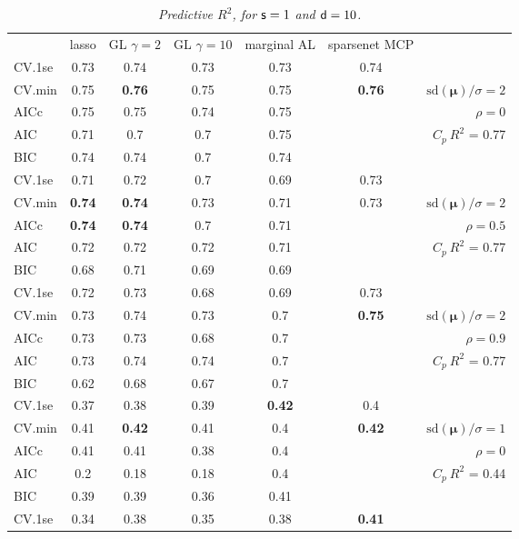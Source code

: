 \documentclass[12pt]{article}
\newcommand{\mr}[1]{\mathrm{#1}}
\newcommand{\bm}[1]{\mathbf{#1}}
\begin{document}
\begin{table}[p]\vspace{-.5cm}
\caption[l]{\label{r2}\it Predictive $R^2$, for ${\sf s}=1$ and  ${\sf d}=10$.}
\vspace{-.5cm}
\small{}
\begin{center}
\begin{tabular}{l*{5}{c}|r}
 & lasso & GL $\gamma=2$ & GL $\gamma=10$ & marginal AL & sparsenet MCP  &  \\
\cline{1-7}
CV.1se & 0.73 & 0.74 & 0.73 & 0.73 & 0.74 &\\
CV.min & 0.75 & {\bf 0.76} & 0.75 & 0.75 & {\bf 0.76} &  $\mr{sd}(\bm{\mu})/\sigma=2$ \\
AICc & 0.75 & 0.75 & 0.74 & 0.75 & & $\rho=0$ \\
AIC & 0.71 & 0.7 & 0.7 & 0.75 & & \multirow{2}{*}{$C_p ~ R^2$ = 0.77} \\
BIC & 0.74 & 0.74 & 0.7 & 0.74 & & \\
 \hline 
CV.1se & 0.71 & 0.72 & 0.7 & 0.69 & 0.73 &\\
CV.min & {\bf 0.74} & {\bf 0.74} & 0.73 & 0.71 & 0.73 &  $\mr{sd}(\bm{\mu})/\sigma=2$ \\
AICc & {\bf 0.74} & {\bf 0.74} & 0.7 & 0.71 & & $\rho=0.5$ \\
AIC & 0.72 & 0.72 & 0.72 & 0.71 & & \multirow{2}{*}{$C_p ~ R^2$ = 0.77} \\
BIC & 0.68 & 0.71 & 0.69 & 0.69 & & \\
 \hline 
CV.1se & 0.72 & 0.73 & 0.68 & 0.69 & 0.73 &\\
CV.min & 0.73 & 0.74 & 0.73 & 0.7 & {\bf 0.75} &  $\mr{sd}(\bm{\mu})/\sigma=2$ \\
AICc & 0.73 & 0.73 & 0.68 & 0.7 & & $\rho=0.9$ \\
AIC & 0.73 & 0.74 & 0.74 & 0.7 & & \multirow{2}{*}{$C_p ~ R^2$ = 0.77} \\
BIC & 0.62 & 0.68 & 0.67 & 0.7 & & \\
 \hline 
CV.1se & 0.37 & 0.38 & 0.39 & {\bf 0.42} & 0.4 &\\
CV.min & 0.41 & {\bf 0.42} & 0.41 & 0.4 & {\bf 0.42} &  $\mr{sd}(\bm{\mu})/\sigma=1$ \\
AICc & 0.41 & 0.41 & 0.38 & 0.4 & & $\rho=0$ \\
AIC & 0.2 & 0.18 & 0.18 & 0.4 & & \multirow{2}{*}{$C_p ~ R^2$ = 0.44} \\
BIC & 0.39 & 0.39 & 0.36 & 0.41 & & \\
 \hline 
CV.1se & 0.34 & 0.38 & 0.35 & 0.38 & {\bf 0.41} &\\

\end{tabular}
\end{center}
\end{table}
\end{document}
